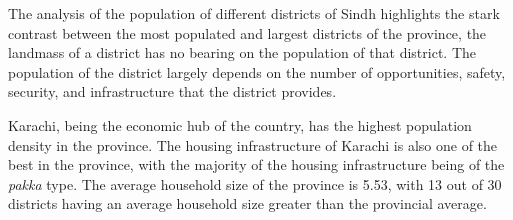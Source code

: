 \documentclass{article}
\begin{document}
\noindent The analysis of the population of different districts of Sindh highlights the stark contrast between the most populated and largest districts of the province, the landmass of a district has no bearing on the population of that district. The population of the district largely depends on the number of opportunities, safety, security, and infrastructure that the district provides.

\vspace{0.5cm}

\noindent Karachi, being the economic hub of the country, has the highest population density in the province. The housing infrastructure of Karachi is also one of the best in the province, with the majority of the housing infrastructure being of the \textit{pakka} type. The average household size of the province is 5.53, with 13 out of 30 districts having an average household size greater than the provincial average.



\end{document}
